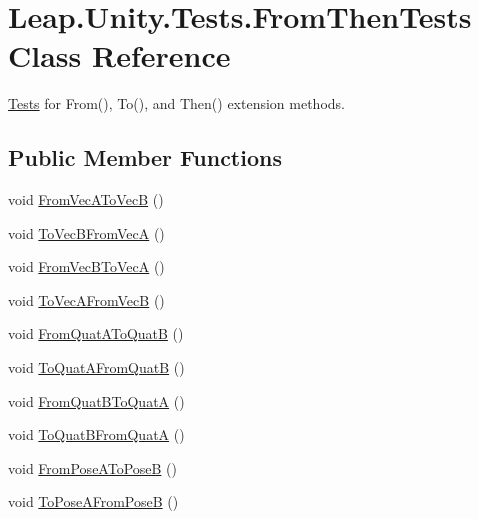 \hypertarget{class_leap_1_1_unity_1_1_tests_1_1_from_then_tests}{}\section{Leap.\+Unity.\+Tests.\+From\+Then\+Tests Class Reference}
\label{class_leap_1_1_unity_1_1_tests_1_1_from_then_tests}


\mbox{\hyperlink{namespace_leap_1_1_unity_1_1_tests}{Tests}} for From(), To(), and Then() extension methods.  


\subsection*{Public Member Functions}
\begin{DoxyCompactItemize}
\item 
void \mbox{\hyperlink{class_leap_1_1_unity_1_1_tests_1_1_from_then_tests_a7cdf13e129d1e3721a6d66047162a040}{From\+Vec\+A\+To\+VecB}} ()
\item 
void \mbox{\hyperlink{class_leap_1_1_unity_1_1_tests_1_1_from_then_tests_a7c4872b9db928bb3a7ef3f3fb44b5965}{To\+Vec\+B\+From\+VecA}} ()
\item 
void \mbox{\hyperlink{class_leap_1_1_unity_1_1_tests_1_1_from_then_tests_ab3937e24eca9eef96c0bfb6fb8453ac7}{From\+Vec\+B\+To\+VecA}} ()
\item 
void \mbox{\hyperlink{class_leap_1_1_unity_1_1_tests_1_1_from_then_tests_a5e8fb810e064bbf2bf636fb0e6bd883d}{To\+Vec\+A\+From\+VecB}} ()
\item 
void \mbox{\hyperlink{class_leap_1_1_unity_1_1_tests_1_1_from_then_tests_aa961d130b906ffede0c2ddc6dda9ea23}{From\+Quat\+A\+To\+QuatB}} ()
\item 
void \mbox{\hyperlink{class_leap_1_1_unity_1_1_tests_1_1_from_then_tests_a5e156d5526c6eac53248cf13b6d4af58}{To\+Quat\+A\+From\+QuatB}} ()
\item 
void \mbox{\hyperlink{class_leap_1_1_unity_1_1_tests_1_1_from_then_tests_a341af363c80bd833e3f3db5f65e3eb6d}{From\+Quat\+B\+To\+QuatA}} ()
\item 
void \mbox{\hyperlink{class_leap_1_1_unity_1_1_tests_1_1_from_then_tests_ad06f16219a12cd095c0477548a01cfd4}{To\+Quat\+B\+From\+QuatA}} ()
\item 
void \mbox{\hyperlink{class_leap_1_1_unity_1_1_tests_1_1_from_then_tests_a318538bbbf16d193449f22667dd06c02}{From\+Pose\+A\+To\+PoseB}} ()
\item 
void \mbox{\hyperlink{class_leap_1_1_unity_1_1_tests_1_1_from_then_tests_a23fce4ff8ac27a902bb42f67d03b06ec}{To\+Pose\+A\+From\+PoseB}} ()

\end{DoxyCompactItemize}
